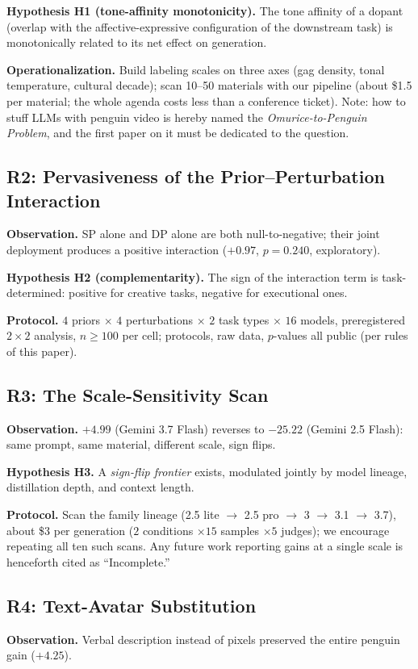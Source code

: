 \documentclass[conference,10pt]{IEEEtran}
\begin{document}
\textbf{Hypothesis H1 (tone-affinity monotonicity).} The tone affinity
of a dopant (overlap with the affective-expressive configuration of
the downstream task) is monotonically related to its net effect on
generation.

\textbf{Operationalization.} Build labeling scales on three axes
(gag density, tonal temperature, cultural decade); scan 10--50
materials with our pipeline (about \$1.5 per material; the whole
agenda costs less than a conference ticket). Note: how to stuff LLMs
with penguin video is hereby named the \emph{Omurice-to-Penguin
Problem}, and the first paper on it must be dedicated to the
question.

\subsection*{R2: Pervasiveness of the Prior--Perturbation Interaction}
\textbf{Observation.} SP alone and DP alone are both null-to-negative;
their joint deployment produces a positive interaction
($+0.97$, $p=0.240$, exploratory).

\textbf{Hypothesis H2 (complementarity).} The sign of the interaction
term is task-determined: positive for creative tasks, negative for
executional ones.

\textbf{Protocol.} $4$ priors $\times$ $4$ perturbations $\times$ $2$
task types $\times$ $16$ models, preregistered $2\times2$ analysis,
$n\ge100$ per cell; protocols, raw data, $p$-values all public (per
rules of this paper).

\subsection*{R3: The Scale-Sensitivity Scan}
\textbf{Observation.} $+4.99$ (Gemini 3.7 Flash) reverses to
$-25.22$ (Gemini 2.5 Flash): same prompt, same material, different
scale, sign flips.

\textbf{Hypothesis H3.} A \emph{sign-flip frontier} exists, modulated
jointly by model lineage, distillation depth, and context length.

\textbf{Protocol.} Scan the family lineage (2.5 lite $\to$ 2.5 pro
$\to$ 3 $\to$ 3.1 $\to$ 3.7), about \$3 per generation
($2$ conditions $\times 15$ samples $\times 5$ judges); we encourage
repeating all ten such scans. Any future work reporting gains at a
single scale is henceforth cited as ``Incomplete.''

\subsection*{R4: Text-Avatar Substitution}
\textbf{Observation.} Verbal description instead of pixels preserved
the entire penguin gain ($+4.25$).
\end{document}
